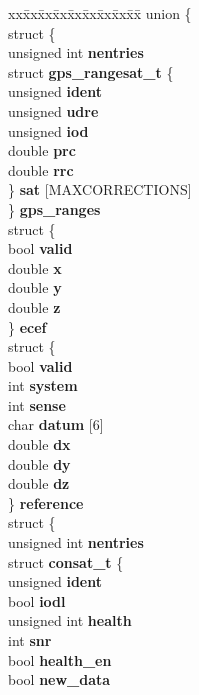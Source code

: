 \begin{DoxyCompactItemize}
\item 
\hypertarget{structrtcm2__t_a941092d45813c175eb3c9cae25758db2}{\begin{tabbing}
xx\=xx\=xx\=xx\=xx\=xx\=xx\=xx\=xx\=\kill
union \{\\
\>struct \{\\
\>\>unsigned int {\bfseries nentries}\\
\>\>struct {\bfseries gps\_rangesat\_t} \{\\
\>\>\>unsigned {\bfseries ident}\\
\>\>\>unsigned {\bfseries udre}\\
\>\>\>unsigned {\bfseries iod}\\
\>\>\>double {\bfseries prc}\\
\>\>\>double {\bfseries rrc}\\
\>\>\} {\bfseries sat} \mbox{[}MAXCORRECTIONS\mbox{]}\\
\>\} {\bfseries gps\_ranges}\\
\>struct \{\\
\>\>bool {\bfseries valid}\\
\>\>double {\bfseries x}\\
\>\>double {\bfseries y}\\
\>\>double {\bfseries z}\\
\>\} {\bfseries ecef}\\
\>struct \{\\
\>\>bool {\bfseries valid}\\
\>\>int {\bfseries system}\\
\>\>int {\bfseries sense}\\
\>\>char {\bfseries datum} \mbox{[}6\mbox{]}\\
\>\>double {\bfseries dx}\\
\>\>double {\bfseries dy}\\
\>\>double {\bfseries dz}\\
\>\} {\bfseries reference}\\
\>struct \{\\
\>\>unsigned int {\bfseries nentries}\\
\>\>struct {\bfseries consat\_t} \{\\
\>\>\>unsigned {\bfseries ident}\\
\>\>\>bool {\bfseries iodl}\\
\>\>\>unsigned int {\bfseries health}\\
\>\>\>int {\bfseries snr}\\
\>\>\>bool {\bfseries health\_en}\\
\>\>\>bool {\bfseries new\_data}\\

\end{tabbing}}
\end{DoxyCompactItemize}
